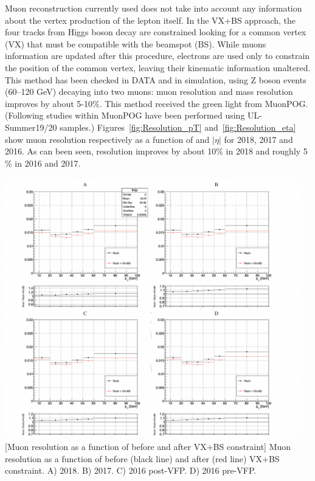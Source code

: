 Muon reconstruction currently used does not take into account any information about the 
vertex production of the lepton itself. %
In the VX+BS approach, the four tracks from Higgs boson decay are constrained looking for a common 
vertex (VX) that must be compatible with the beamspot (BS). 
While muons information are updated after this procedure,
electrons are used only to constrain the position of the common vertex, 
leaving their kinematic information unaltered. \\
This method has been checked in DATA and in simulation, using Z boson events (60--120 GeV)
decaying into two muons: muon \pT resolution and mass resolution improves by about 5-10\%. 
This method received the green light from MuonPOG.\\ 
(Following studies within MuonPOG have been performed using UL-Summer19/20 samples.)
Figures~\ref{fig:Resolution_pT} and~\ref{fig:Resolution_eta} show muon resolution respectively 
as a function of \pT and $|\eta|$ for 2018, 2017 and 2016.
As can been seen, resolution improves by about 10$\%$ in 2018 and roughly 5$\%$ in 2016 and 2017.
\begin{multiFigure}
    \centering
        \includegraphics[width=0.96\textwidth]{figures/higgsmassmeas/vxbs/vxbs_muon_pTresol_vs_pT.png}
        [Muon \pT resolution as a function of \pT before and after VX+BS constraint]
        {Muon \pT resolution as a function of \pT before (black line) and after (red line) VX+BS constraint.
        \;A) 2018.
        \;B) 2017.
        \;C) 2016 post-VFP.
        \;D) 2016 pre-VFP.}
\label{fig:Resolution_pT}
\end{multiFigure}
